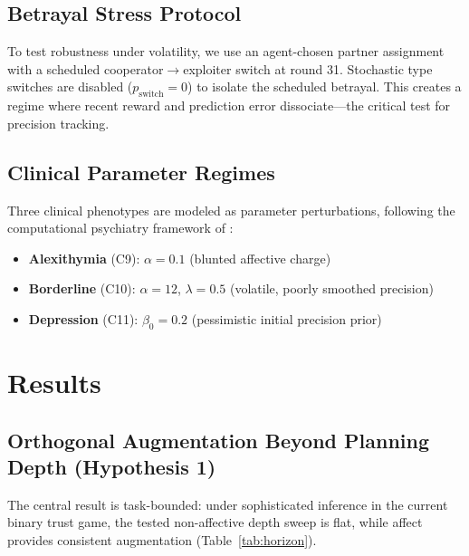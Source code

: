 \documentclass[11pt,a4paper]{article}
\begin{document}
\subsection{Betrayal Stress Protocol}

To test robustness under volatility, we use an agent-chosen partner assignment with a scheduled cooperator$\to$exploiter switch at round 31. Stochastic type switches are disabled ($p_\text{switch} = 0$) to isolate the scheduled betrayal. This creates a regime where recent reward and prediction error dissociate---the critical test for precision tracking.

\subsection{Clinical Parameter Regimes}

Three clinical phenotypes are modeled as parameter perturbations, following the computational psychiatry framework of \citet{smith2021bayesian}:
\begin{itemize}[nosep]
  \item \textbf{Alexithymia} (C9): $\alpha = 0.1$ (blunted affective charge)
  \item \textbf{Borderline} (C10): $\alpha = 12$, $\lambda = 0.5$ (volatile, poorly smoothed precision)
  \item \textbf{Depression} (C11): $\beta_0 = 0.2$ (pessimistic initial precision prior)
\end{itemize}

\section{Results}
\label{sec:results}

\subsection{Orthogonal Augmentation Beyond Planning Depth (Hypothesis 1)}

The central result is task-bounded: under sophisticated inference in the current binary trust game, the tested non-affective depth sweep is flat, while affect provides consistent augmentation (Table~\ref{tab:horizon}).
\end{document}
